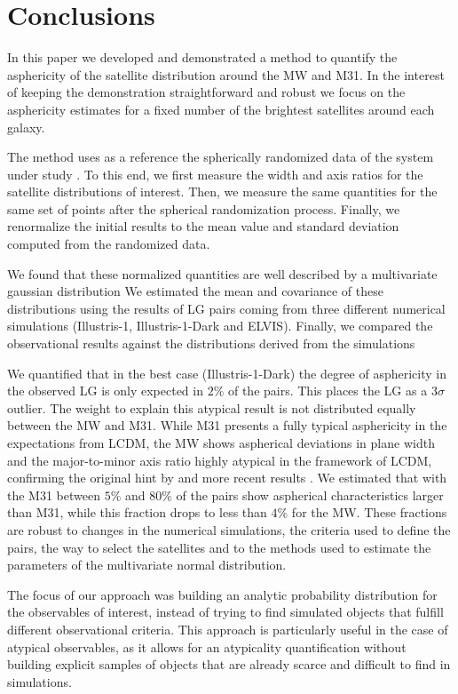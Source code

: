 \documentclass[a4paper,fleqn,usenatbib]{mnras}
\begin{document}
\section{Conclusions}\label{sec:conclusions}

In this paper we developed and demonstrated a method to quantify the
asphericity of the satellite distribution around the MW and M31.  
In the interest of keeping the demonstration straightforward and robust we
focus on the asphericity estimates for a fixed number of the brightest
satellites around each galaxy. 

The method uses as a reference the spherically randomized data
of the system under study \citep{2017AN....338..854P}.  
To this end, we first measure the width and axis ratios for the satellite
distributions of interest. 
Then, we measure the same quantities for the same set of points after
the spherical randomization process.
Finally, we renormalize the initial results to the mean value and
standard deviation computed from the randomized data.  

We found that these normalized quantities are well described by
a multivariate gaussian distribution 
We estimated the mean and covariance of these distributions using
the results of LG pairs coming from three different numerical
simulations (Illustris-1, Illustris-1-Dark and ELVIS). 
Finally, we compared the observational results against the
distributions derived from the simulations

We quantified that in the best case (Illustris-1-Dark) the degree of
asphericity in the observed LG is only expected in $2\%$ of the
pairs. 
This places the LG as a $3\sigma$ outlier.   
The weight to explain this atypical result is not distributed equally
between the MW and M31. 
While M31 presents a fully typical asphericity in the expectations
from LCDM, the MW shows aspherical deviations in plane width and the
major-to-minor axis ratio highly atypical in the framework of LCDM,
confirming the original hint by \cite{2005A&A...431..517K} and more
recent results \citep{2012MNRAS.423.1109P,2015ApJ...815...19P}. 
We estimated that with the M31 between $5\%$ and $80\%$ of the pairs
show aspherical characteristics larger than M31, while this fraction
drops to less than $4\%$ for the MW.  
These fractions are robust to changes in the numerical simulations,
the criteria used to define the pairs, the way to select the
satellites and to the methods used to estimate the parameters of the
multivariate normal distribution.


The focus of our approach was building an analytic probability
distribution for the observables of interest, instead of trying to
find simulated objects that fulfill different observational criteria. 
This approach is particularly useful in the case of atypical
observables, as it allows for an atypicality quantification without
building explicit samples of objects that are already scarce and
difficult to find in simulations.  
\end{document}
